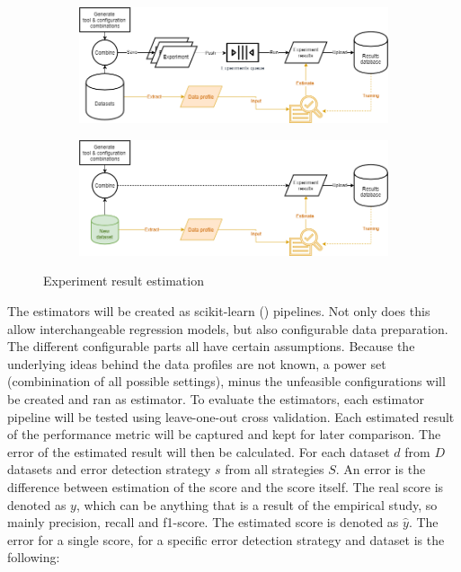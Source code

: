 \begin{figure}%
	\centering
	\begin{subfigure}[b]{\textwidth}
		\includegraphics[width=1\linewidth]{thesis/Figures/PerformanceEstimation-Estimation.png}
		\caption{}
		\label{fig:estimateperformance_a} 
	\end{subfigure}
	
	\begin{subfigure}[b]{\textwidth}
		\includegraphics[width=1\linewidth]{thesis/Figures/PerformanceEstimation-Skip_real_run.png}
		\caption{}
		\label{fig:estimateperformance_b}
	\end{subfigure}
	\caption{Experiment result estimation}
\end{figure}

The estimators will be created as scikit-learn (\cite{Pedregosa2011-su}) pipelines. Not only does this allow interchangeable regression models, but also configurable data preparation. The different configurable parts all have certain assumptions. Because the underlying ideas behind the data profiles are not known, a power set (combinination of all possible settings), minus the unfeasible configurations will be created and ran as estimator. 
To evaluate the estimators, each estimator pipeline will be tested using leave-one-out cross validation. Each estimated result of the performance metric will be captured and kept for later comparison. The error of the estimated result will then be calculated. For each dataset $d$ from $D$ datasets and error detection strategy $s$ from all strategies $S$. An error is the difference between estimation of the score and the score itself. The real score is denoted as $y$, which can be anything that is a result of the empirical study, so mainly precision, recall and f1-score. The estimated score is denoted as $\hat{y}$. The error for a single score, for a specific error detection strategy and dataset is the following:

